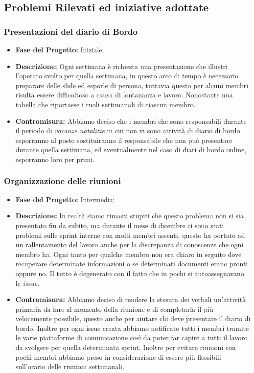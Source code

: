 \documentclass{article}
\begin{document}
\subsection{Problemi Rilevati ed iniziative adottate}
\subsubsection{Presentazioni del diario di Bordo}
\begin{itemize}
    \item \textbf{Fase del Progetto:} Iniziale;
    \item \textbf{Descrizione:} Ogni settimana è richiesta una presentazione che illustri l'operato svolto per quella settimana, in questo arco di tempo è necessario preparare delle slide ed esporle di persona, tuttavia questo per alcuni membri risulta essere difficoltoso a causa di lontananza e lavoro. Nonostante una tabella che riportasse i ruoli settimanali di ciascun membro.
    \item \textbf{Contromisura:} Abbiamo deciso che i membri che sono responsabili durante il periodo di \textit{vacanze natalizie} in cui non vi sono attività di diario di bordo esporranno al posto sostituiranno il responsabile che non può presentare durante quella settimana, ed eventualmente nel caso di diari di bordo online, esporranno loro per primi.
\end{itemize}
\subsubsection{Organizzazione delle riunioni}
\begin{itemize}
    \item \textbf{Fase del Progetto:} Intermedia;
    \item \textbf{Descrizione:} In realtà siamo rimasti stupiti che questo problema non si sia presentato fin da subito, ma durante il mese di dicembre ci sono stati problemi sulle sprint interne con molti membri assenti, questo ha portato ad un rallentamento del lavoro anche per la discrepanza di conoscenze che ogni membro ha. Ogni tanto per qualche membro non era chiaro in seguito dove recuperare determinate informazioni o se determinati documenti erano pronti oppure no. Il tutto è degenerato con il fatto che in pochi si autoassegnavano le \textit{issue}.
    \item \textbf{Contromisura:} Abbiamo deciso di rendere la stesura dei verbali un'attività primaria da fare al momento della riunione e di completarla il più velocemente possibile, questo anche per aiutare chi deve presentare il diario di bordo. Inoltre per ogni issue creata abbiamo notificato tutti i membri tramite le varie piattaforme di comunicazione così da poter far capire a tutti il lavoro da svolgere per quella determinata sprint. Inoltre per evitare riunioni con pochi membri abbiamo preso in considerazione di essere più flessibili sull'orario delle riunioni settimanali.
\end{itemize}
\newpage
\end{document}
